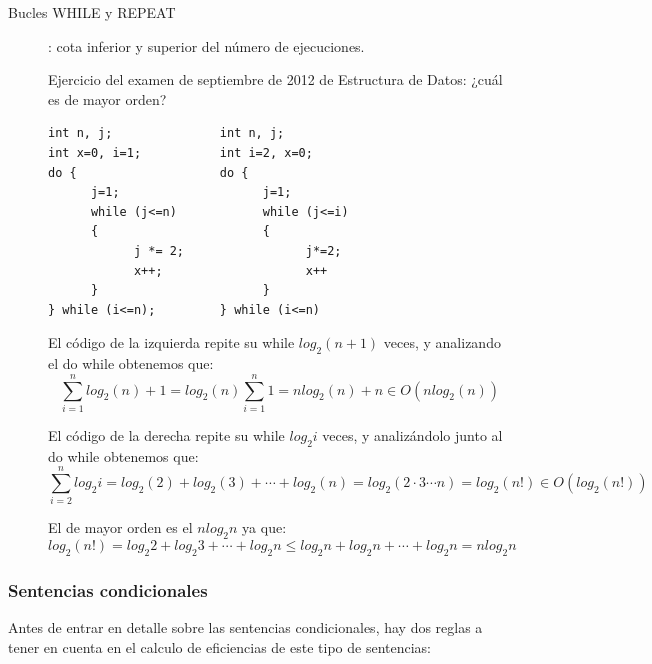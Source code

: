 \documentclass[10pt,a4paper,spanish]{report}
\theoremstyle{definition}
\theoremstyle{remark}
\begin{document}
\begin{description}
\begin{enumerate}
        \end{enumerate}
        \item [Bucles WHILE y REPEAT]: cota inferior y superior del número de ejecuciones.

        \label{eficiencia_sept2012}

        Ejercicio del examen de septiembre de 2012 de Estructura de Datos: ¿cuál es de mayor orden?
\begin{verbatim}
int n, j;               int n, j;
int x=0, i=1;           int i=2, x=0;
do {                    do {
      j=1;                    j=1;
      while (j<=n)            while (j<=i)
      {                       {
            j *= 2;                 j*=2;
            x++;                    x++
      }                       }
} while (i<=n);         } while (i<=n)
\end{verbatim}

        El código de la izquierda repite su while $log_{2}(n+1)$ veces, y analizando el do while obtenemos que:
        \begin{displaymath}
        \sum_{i=1}^{n} log_{2} (n) + 1 = log_{2} (n) \sum_{i=1}^{n} 1 = nlog_{2}(n) + n \in O(nlog_{2}(n))
        \end{displaymath}

        El código de la derecha repite su while $log_{2} i$ veces, y analizándolo junto al do while obtenemos que:
        \begin{displaymath}
        \sum_{i=2}^{n} log_{2} i = log_{2} (2) + log_{2} (3) + \cdots + log_{2}(n) = log_{2} (2 \cdot 3 \cdots n) = log_{2} (n!) \in O(log_{2}(n!))
        \end{displaymath}

        El de mayor orden es el $nlog_{2} n$ ya que:
        \begin{displaymath}
        log_{2} (n!) = log_{2} 2 + log_{2} 3 + \cdots + log_{2} n \leq log_{2} n + log_{2} n + \cdots + log_{2} n = nlog_{2} n
        \end{displaymath}

    \end{description}

    \subsubsection{\textcolor{YellowOrange}Sentencias condicionales}

    Antes de entrar en detalle sobre las sentencias condicionales, hay dos reglas a tener en cuenta en el calculo de eficiencias de este tipo de sentencias:
\end{document}
